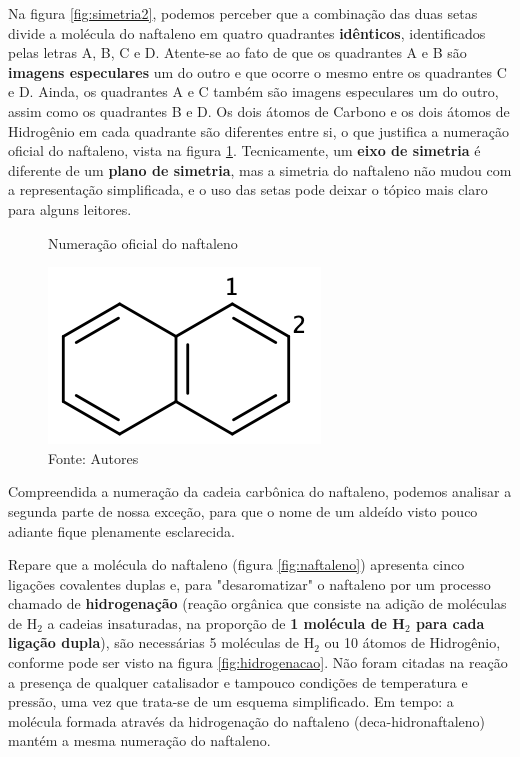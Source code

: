 Na figura \ref{fig:simetria2}, podemos perceber que a combinação das duas setas divide a molécula do naftaleno em quatro quadrantes \textbf{idênticos}, identificados pelas letras A, B, C e D. Atente-se ao fato de que os quadrantes A e B são \textbf{imagens especulares} um do outro e que ocorre o mesmo entre os quadrantes C e D. Ainda, os quadrantes A e C também são imagens especulares um do outro, assim como os quadrantes B e D. Os dois átomos de Carbono e os dois átomos de Hidrogênio em cada quadrante são diferentes entre si, o que justifica a numeração oficial do naftaleno, vista na figura \ref{fig:numerado}. Tecnicamente, um \textbf{eixo de simetria} é diferente de um \textbf{plano de simetria}, mas a simetria do naftaleno não mudou com a representação simplificada, e o uso das setas pode deixar o tópico mais claro para alguns leitores.

\begin{figure}[h]
	\centering
	\vspace{0.5cm}
	\caption{Numeração oficial do naftaleno}
	\includegraphics[width=0.35\linewidth]{imagens/numerado.png}
	\caption*{Fonte: Autores}
	\label{fig:numerado}
\end{figure}

Compreendida a numeração da cadeia carbônica do naftaleno, podemos analisar a segunda parte de nossa exceção, para que o nome de um aldeído visto pouco adiante fique plenamente esclarecida.

Repare que a molécula do naftaleno (figura \ref{fig:naftaleno}) apresenta cinco ligações covalentes duplas e, para "desaromatizar" o naftaleno por um processo chamado de \textbf{hidrogenação} (reação orgânica que consiste na adição de moléculas de H$_2$ a cadeias insaturadas, na proporção de \textbf{1 molécula de H$_2$ para cada ligação dupla}), são necessárias 5 moléculas de H$_2$ ou 10 átomos de Hidrogênio, conforme pode ser visto na figura \ref{fig:hidrogenacao}. Não foram citadas na reação a presença de qualquer catalisador e tampouco condições de temperatura e pressão, uma vez que trata-se de um esquema simplificado. Em tempo: a molécula formada através da hidrogenação do naftaleno (deca-hidronaftaleno) mantém a mesma numeração do naftaleno.


